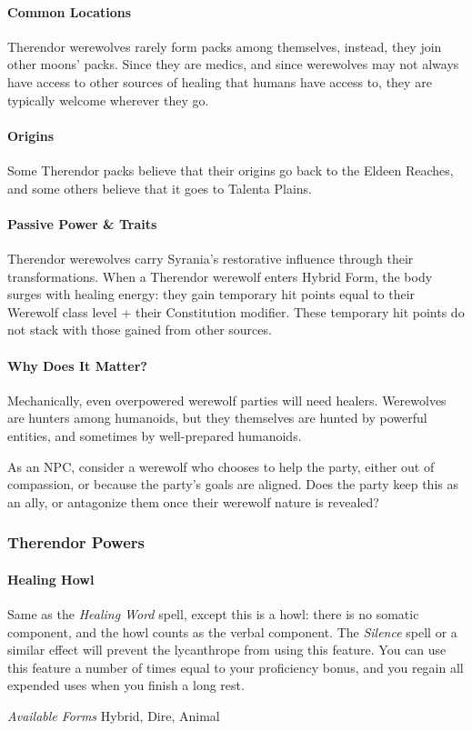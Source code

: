 \documentclass[twocolumn]{dndbook}
\begin{document}
\paragraph*{Common Locations} Therendor werewolves rarely form packs among themselves,
instead, they join other moons' packs. Since they are medics, and since werewolves may not
always have access to other sources of healing that humans have access to,
they are typically welcome wherever they go.\par

\paragraph*{Origins} Some Therendor packs believe that their origins go back to the Eldeen Reaches, and some others believe that it goes to Talenta Plains.\par

\paragraph*{Passive Power \& Traits} Therendor werewolves carry Syrania's restorative influence through their transformations.
When a Therendor werewolf enters Hybrid Form, the body surges with healing energy: they gain temporary hit points equal to their Werewolf class level + their Constitution modifier.
These temporary hit points do not stack with those gained from other sources.

\paragraph*{Why Does It Matter?} Mechanically, even overpowered werewolf parties will need healers.
Werewolves are hunters among humanoids, but they themselves are hunted by powerful entities,
and sometimes by well-prepared humanoids.

As an NPC, consider a werewolf who chooses to help the party, either out of compassion, or because the party's goals are aligned.
Does the party keep this as an ally, or antagonize them once their werewolf nature is revealed?

\subsubsection{Therendor Powers}

\paragraph*{Healing Howl}
Same as the \emph{Healing Word} spell, except this is a howl: there is no somatic component, and the howl counts as the verbal component.
The \emph{Silence} spell or a similar effect will prevent the lycanthrope from using this feature.
You can use this feature a number of times equal to your proficiency bonus, and you regain all expended uses when you finish a long rest.\par
\emph{Available Forms} Hybrid, Dire, Animal\par
\end{document}
